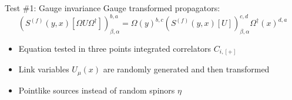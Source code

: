 \documentclass{beamer}
\begin{document}
\begin{frame}{Test \#1: Gauge invariance}
      Gauge transformed propagators:\newline
      \begin{equation*}
            \left(S^{(f)}(y, x)[\Omega U \Omega^\dagger]\right)^{b,a}_{\beta,\alpha} = \Omega (y)^{b,c} \left(S^{(f)}(y,x)[U]\right)^{c,d}_{\beta,\alpha} \Omega^\dagger (x)^{d,a}
      \end{equation*}
      \begin{itemize}
            \item Equation tested in three points integrated correlators $C_{i,[+]}$
            \item Link variables $U_\mu (x)$ are randomly generated and then transformed
            \item Pointlike sources instead of random spinors $\eta$
      \end{itemize}
\end{frame}
\end{document}
